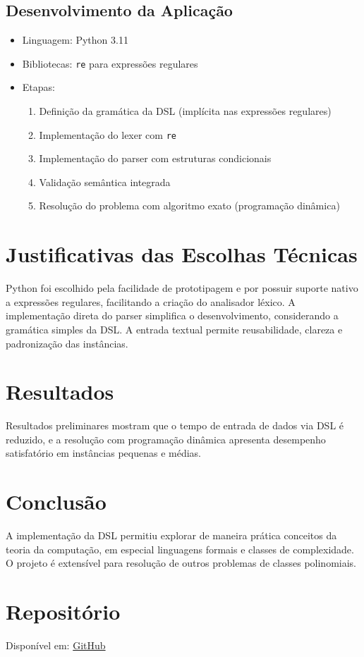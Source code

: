 \documentclass[conference]{IEEEtran}
\begin{document}
\subsection{Desenvolvimento da Aplicação}
\begin{itemize}
    \item Linguagem: Python 3.11
    \item Bibliotecas: \texttt{re} para expressões regulares
    \item Etapas:
    \begin{enumerate}
        \item Definição da gramática da DSL (implícita nas expressões regulares)
        \item Implementação do lexer com \texttt{re}
        \item Implementação do parser com estruturas condicionais
        \item Validação semântica integrada
        \item Resolução do problema com algoritmo exato (programação dinâmica)
    \end{enumerate}
\end{itemize}

\section{Justificativas das Escolhas Técnicas}
Python foi escolhido pela facilidade de prototipagem e por possuir suporte nativo a expressões regulares, facilitando a criação do analisador léxico. A implementação direta do parser simplifica o desenvolvimento, considerando a gramática simples da DSL. A entrada textual permite reusabilidade, clareza e padronização das instâncias.

\section{Resultados}
Resultados preliminares mostram que o tempo de entrada de dados via DSL é reduzido, e a resolução com programação dinâmica apresenta desempenho satisfatório em instâncias pequenas e médias.

\section{Conclusão}
A implementação da DSL permitiu explorar de maneira prática conceitos da teoria da computação, em especial linguagens formais e classes de complexidade. O projeto é extensível para resolução de outros problemas de classes polinomiais.

\section*{Repositório}
Disponível em: \href{https://github.com/Guilherme-del/uniararas/blob/master/python/teoriaCompiladores/n2/proj/main.py}{GitHub}



\end{document}
